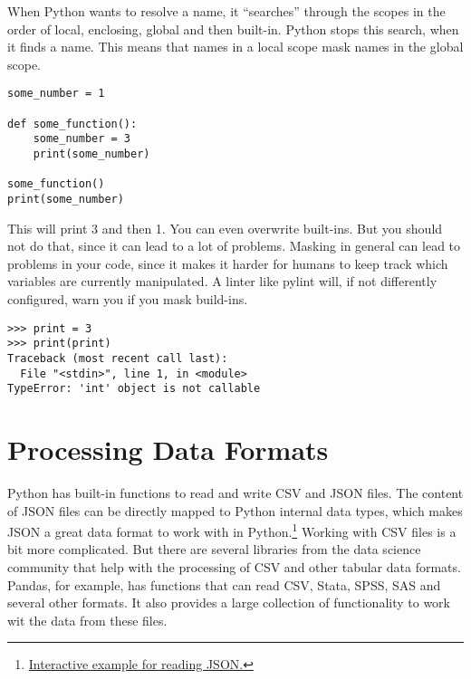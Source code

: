 \documentclass{article}
\newcommand{\qq}[1]{``#1''}
\begin{document}
When Python wants to resolve a name, it \qq{searches} through the scopes in the order
of local, enclosing, global and then built-in.
Python stops this search, when it finds a name.
This means that names in a local scope mask names in the global scope.

\begin{lstlisting}
some_number = 1

def some_function():
    some_number = 3
    print(some_number)

some_function()
print(some_number)
\end{lstlisting}

This will print 3 and then 1.
You can even overwrite built-ins.
But you should not do that, since it can lead to a lot of problems.
Masking in general can lead to problems in your code, since it makes it harder
for humans to keep track which variables are currently manipulated.
A linter like pylint will, if not differently configured, warn you if you mask
build-ins.

\begin{lstlisting}
>>> print = 3
>>> print(print)
Traceback (most recent call last):
  File "<stdin>", line 1, in <module>
TypeError: 'int' object is not callable
\end{lstlisting}


\section{Processing Data Formats}

Python has built-in functions to read and write CSV and JSON files.
The content of JSON files can be directly mapped to Python internal data types,
which makes JSON a great data format to work with in Python.\footnote{
\href{http://pythontutor.com/visualize.html#code=import%20json%0A%0Asome_unparsed_json%3A%20str%20%3D%20%22%22%22%7B%0A%22my_key%22%3A%20%22my_value%22,%0A%22my_list_key%22%3A%20%5B1,%202,%203%5D%0A%7D%0A%22%22%22%0A%0Aparsed_json%20%3D%20json.loads%28some_unparsed_json%29%0Aprint%28parsed_json%5B%22my_list_key%22%5D%29&cumulative=false&curInstr=0&heapPrimitives=nevernest&mode=display&origin=opt-frontend.js&py=3&rawInputLstJSON=%5B%5D&textReferences=false}{Interactive example for reading JSON.}
}
Working with CSV files is a bit more complicated.
But there are several libraries from the data science community that help with
the processing of CSV and other tabular data formats.
Pandas, for example, has functions that can read CSV,
Stata, SPSS, SAS and several other formats.
It also provides a large collection of functionality to work wit the data from these files.


\printbibliography[type=book,title={Book Sources}]
\end{document}
